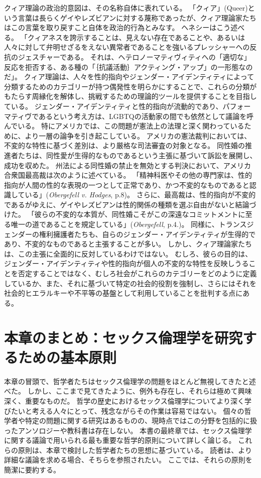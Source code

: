 \documentclass[paper=a4,book,openany]{jlreq}
\begin{document}
クィア理論の政治的意図は、その名称自体に表れている。
「クィア」(Queer)という言葉は長らくゲイやレズビアンに対する蔑称であったが、クィア理論家たちはこの言葉を取り戻すこと自体を政治的行為とみなす。
ヘネシーはこう述べる。
「クィアネスを誇示することは、見えない存在であることや、あるいは人々に対して弁明せざるをえない異常者であることを強いるプレッシャーへの反抗のジェスチャーである。
それは、ヘテロノーマティヴィティへの「適切な」反応を拒否する、ある種の「｛抗議活動｝{アクティング・アップ}」の一形態なのだ」\citep[p.867]{hennessy93:_queer_theor}。
クィア理論は、人々を性的指向やジェンダー・アイデンティティによって分類するためのカテゴリーが持つ偶発性を明らかにすることで、これらの分類がもたらす周縁化を解体し、挑戦するための理論的ツールを提供することを目指している。
ジェンダー・アイデンティティと性的指向が流動的であり、パフォーマティヴであるという考え方は、LGBTQの活動家の間でも依然として議論を呼んでいる。
特にアメリカでは、この問題が憲法上の法理と深く関わっているために、より一層の論争を引き起こしている。
アメリカの憲法裁判においては、不変的な特性に基づく差別は、より厳格な司法審査の対象となる。
同性婚の推進者たちは、同性愛が生得的なものであるという主張に基づいて訴訟を展開し、成功を収めた。
州法による同性婚の禁止を無効とする判決において、アメリカ合衆国最高裁は次のように述べている。
「精神科医やその他の専門家は、性的指向が人間の性的な表現の一つとして正常であり、かつ不変的なものであると認識している」(\emph{Obergefell v. Hodges}, p.8)。
さらに、最高裁は、性的指向が不変的であるがゆえに、ゲイやレズビアンは性的関係の種類を選ぶ自由がないと結論づけた。
「彼らの不変的な本質が、同性婚こそがこの深遠なコミットメントに至る唯一の道であることを規定している」(\emph{Obergefell}, p.4.)。
同様に、トランスジェンダーの権利擁護者たちも、自らのジェンダー・アイデンティティが生得的であり、不変的なものであると主張することが多い。
しかし、クィア理論家たちは、この主張に全面的に反対しているわけではない。
むしろ、彼らの目的は、ジェンダー・アイデンティティや性的指向が個人の不変的な特性を反映しうることを否定することではなく、むしろ社会がこれらのカテゴリーをどのように定義しているか、また、それに基づいて特定の社会的役割を強制し、さらにはそれを社会的ヒエラルキーや不平等の基盤として利用していることを批判する点にある。

\section{本章のまとめ：セックス倫理学を研究するための基本原則}

本章の冒頭で、哲学者たちはセックス倫理学の問題をほとんど無視してきたと述べた。
しかし、ここまで見てきたように、例外も存在し、それらは極めて興味深く、重要なものだ。
哲学の歴史におけるセックス倫理学についてより深く学びたいと考える人々にとって、残念ながらその作業は容易ではない。
個々の哲学者や特定の問題に関する研究はあるものの、現時点ではこの分野を包括的に扱ったアンソロジーや教科書は存在しない。
本書の最終章では、セックス倫理学に関する議論で用いられる最も重要な哲学的原則について詳しく論じる。
これらの原則は、本章で検討した哲学者たちの思想に基づいている。
読者は、より詳細な議論を求める場合、そちらを参照されたい。
ここでは、それらの原則を簡潔に要約する。
\end{document}
